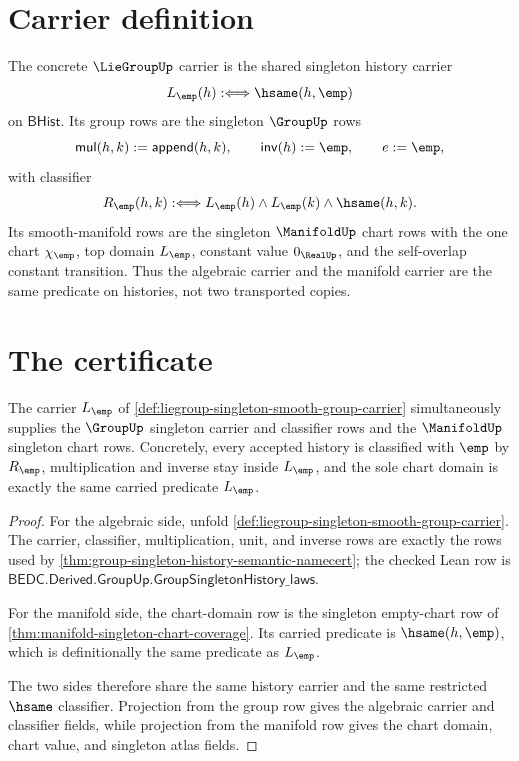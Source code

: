 \section{Carrier definition}
\label{sec:liegroup-carrier}

\begin{definition}
\label{def:liegroup-singleton-smooth-group-carrier}
The concrete $\LieGroupUp$ carrier is the shared singleton history carrier
$$
L_{\emp}(h):\Longleftrightarrow \hsame(h,\emp)
$$
on $\mathsf{BHist}$. Its group rows are the singleton $\GroupUp$ rows
$$
\mathsf{mul}(h,k):=\mathsf{append}(h,k),\qquad
\mathsf{inv}(h):=\emp,\qquad
e:=\emp,
$$
with classifier
$$
R_{\emp}(h,k):\Longleftrightarrow
L_{\emp}(h)\wedge L_{\emp}(k)\wedge \hsame(h,k).
$$
Its smooth-manifold rows are the singleton $\ManifoldUp$ chart rows with the
one chart $\chi_{\emp}$, top domain $L_{\emp}$, constant value $0_{\RealUp}$,
and the self-overlap constant transition. Thus the algebraic carrier and the
manifold carrier are the same predicate on histories, not two transported
copies.
\end{definition}

\section{The certificate}
\label{sec:liegroup-certificate}

\begin{theorem}
\label{thm:liegroup-singleton-carrier-obligation}
The carrier $L_{\emp}$ of
\autoref{def:liegroup-singleton-smooth-group-carrier} simultaneously supplies
the $\GroupUp$ singleton carrier and classifier rows and the $\ManifoldUp$
singleton chart rows. Concretely, every accepted history is classified with
$\emp$ by $R_{\emp}$, multiplication and inverse stay inside $L_{\emp}$, and
the sole chart domain is exactly the same carried predicate $L_{\emp}$.
\end{theorem}
\begin{proof}
For the algebraic side, unfold
\autoref{def:liegroup-singleton-smooth-group-carrier}. The carrier,
classifier, multiplication, unit, and inverse rows are exactly the rows used by
\autoref{thm:group-singleton-history-semantic-namecert}; the checked Lean row
is
$\mathsf{BEDC.Derived.GroupUp.GroupSingletonHistory\_laws}$.

For the manifold side, the chart-domain row is the singleton empty-chart row
of \autoref{thm:manifold-singleton-chart-coverage}. Its carried predicate is
$\hsame(h,\emp)$, which is definitionally the same predicate as $L_{\emp}$.

The two sides therefore share the same history carrier and the same restricted
$\hsame$ classifier. Projection from the group row gives the algebraic carrier
and classifier fields, while projection from the manifold row gives the chart
domain, chart value, and singleton atlas fields.
\end{proof}


